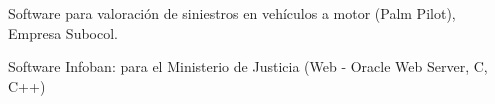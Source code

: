 \begin{entrylist}
{Software para valoración de siniestros en vehículos a motor (Palm Pilot), Empresa
Subocol.

Software Infoban: para el Ministerio de Justicia (Web - Oracle Web Server, C,
C++)



}

  \end{entrylist}
